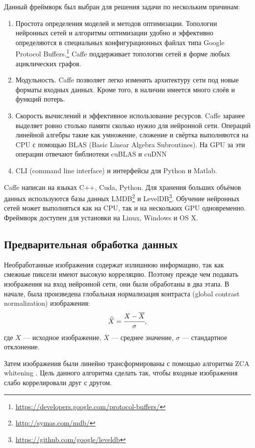 Данный фреймворк был выбран для решения задачи по нескольким причинам:
\begin{enumerate}
    \item Простота определения моделей и методов оптимизации. Топологии нейронных сетей и алгоритмы оптимизации удобно и 
    эффективно определяются в специальных конфигурационных файлах типа Google Protocol 
    Buffers.\footnote{\url{https://developers.google.com/protocol-buffers/}} Caffe поддерживает топологии сетей в форме любых 
    ациклических графов.
    \item Модульность. Caffe позволяет легко изменять архитектуру сети под новые форматы входных данных. Кроме того, в наличии 
    имеется много слоёв и функций потерь.
    \item Скорость вычислений и эффективное использование ресурсов. Caffe заранее выделяет ровно столько памяти сколько нужно для 
    нейронной сети. Операций линейной алгебры такие как умножение, сложение и свёртка выполняются на CPU с помощью BLAS (Basic 
    Linear Algebra Subroutines). На GPU за эти операции отвечают библиотеки cuBLAS и cuDNN 
    \cite{DBLP:journals/corr/ChetlurWVCTCS14}
    \item CLI (command line interface) и интерфейсы для Python и Matlab.
\end{enumerate}

Caffe написан на языках C++, Cuda, Python. Для хранения больших объёмов данных используются базы данных 
LMDB\footnote{\url{http://symas.com/mdb/}} и LevelDB\footnote{\url{https://github.com/google/leveldb}}. Обучение нейронных сетей 
может выполняться как на CPU, так и на нескольких GPU одновременно. Фреймворк доступен для установки на Linux, Windows и OS X.

\subsection{Предварительная обработка данных}
Необработанные изображения содержат излишнюю информацию, так как смежные пиксели имеют высокую корреляцию. Поэтому прежде чем 
подавать изображения на вход нейронной сети, они были обработаны в два этапа. В начале, была произведена глобальная нормализация контраста
(global contrast normalization) изображения:
\[ \widehat{X} = \cfrac{X - \overline{X}}{\sigma},\]
где $X$ --- исходное изображение, $\overline{X}$ --- среднее значение, $\sigma$ --- стандартное отклонение.

Затем изображения были линейно трансформированы с помощью алгоритма ZCA whitening \cite{learningmultiple}.
Цель данного алгоритма сделать так, чтобы входные изображения слабо коррелировали друг с другом.

